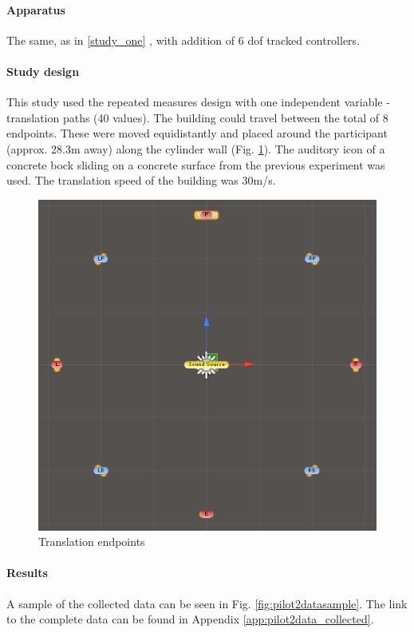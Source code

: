 \paragraph{Apparatus} The same, as in \ref{study_one} , with addition of 6 \gls{dof} tracked controllers.

\paragraph{Study design}
This study used the repeated measures design with one independent variable - translation paths (40 values).
The building could travel between the total of 8 endpoints. These were moved equidistantly and  placed around the participant (approx. 28.3m away) along the cylinder wall (Fig. \ref{fig:pilot2endpoints}).
The auditory icon of a concrete bock sliding on a concrete surface from the previous experiment was used. The translation speed of the building was 30m/s.

\begin{figure}
	\centering
	\includegraphics[width=0.7\linewidth]{figures/pilot2_endpoints}
	\caption{Translation endpoints}
	\label{fig:pilot2endpoints}
\end{figure}

\paragraph{Results}

A sample of the collected data can be seen in Fig. \ref{fig:pilot2datasample}. The link to the complete data can be found in Appendix \ref{app:pilot2data_collected}.

